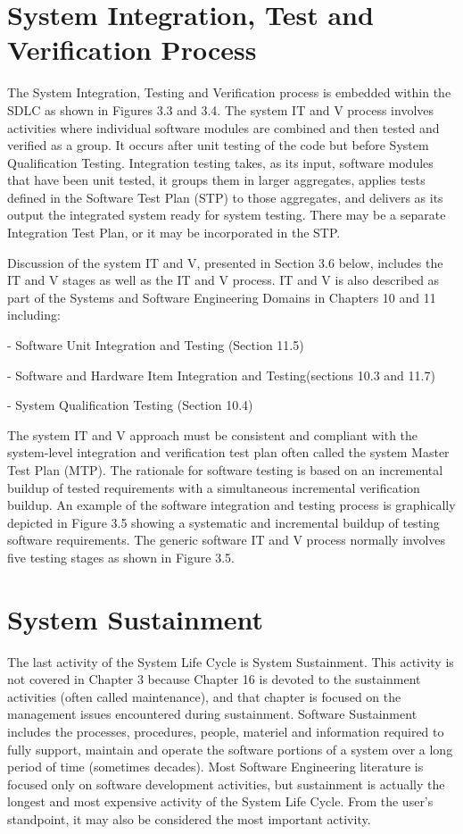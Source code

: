 \documentclass{book}
\begin{document}
\section{System Integration, Test and Verification Process}

The System Integration, Testing and Verification process is embedded within the SDLC as shown in Figures 3.3 and 3.4. The system IT and V process involves activities where individual software modules are combined and then tested and verified as a group. It occurs after unit testing of the code but before System Qualification Testing. Integration testing takes, as its input, software modules that have been unit tested, it groups them in larger aggregates, applies tests defined in the Software Test Plan (STP) to those aggregates, and delivers as its output the integrated system ready for system testing. There may be a separate Integration Test Plan, or it may be incorporated in the STP.

Discussion of the system IT and V, presented in Section 3.6 below, includes the IT and V stages as well as the IT and V process. IT and V is also described as part of the Systems and Software Engineering Domains in Chapters 10 and 11 including:

- Software Unit Integration and Testing (Section 11.5)

- Software and Hardware Item Integration and Testing(sections 10.3 and 11.7)

- System Qualification Testing (Section 10.4)

The system IT and V approach must be consistent and compliant with the system-level integration and verification test plan often called the system Master Test Plan (MTP). The rationale for software testing is based on an incremental buildup of tested requirements with a simultaneous incremental verification buildup. An example of the software integration and testing process is graphically depicted in Figure 3.5 showing a systematic and incremental buildup of testing software requirements. The generic software IT and V process normally involves five testing stages as shown in Figure 3.5.

\section{System Sustainment}
The last activity of the System Life Cycle is System
Sustainment. This activity is not covered in Chapter 3
because Chapter 16 is devoted to the sustainment activities
(often called maintenance), and that chapter is focused on
the management issues encountered during sustainment.
Software Sustainment includes the processes, procedures,
people, materiel and information required to fully support,
maintain and operate the software portions of a system over
a long period of time (sometimes decades). Most Software
Engineering literature is focused only on software development
activities, but sustainment is actually the longest and
most expensive activity of the System Life Cycle. From the user’s
standpoint, it may also be considered the most important
activity.
\end{document}
